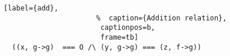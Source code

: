 \begin{figure}[!t]
  \centering
  \begin{minipage}{\columnwidth}
    \begin{lstlisting}[label={add},
                      %  caption={Addition relation},
                       captionpos=b,
                       frame=tb]
  ((x, g->g)  === O /\ (y, g->g) === (z, f->g))
    \end{lstlisting}
  \end{minipage}
\end{figure}